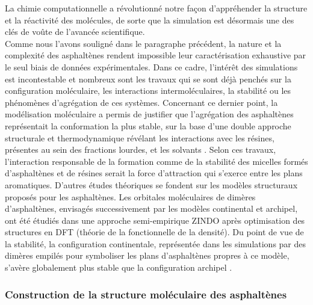\documentclass[12pt,a4paper]{book}
\begin{document}
La chimie computationnelle a révolutionné notre façon d'appréhender la structure et la réactivité des molécules, de sorte que la simulation est désormais une des clés de voûte de l'avancée scientifique. \\
Comme nous l'avons souligné dans le paragraphe précédent, la nature et la complexité des asphaltènes rendent impossible leur caractérisation exhaustive par le seul biais de données expérimentales. Dans ce cadre, l'intérêt des simulations est incontestable et nombreux sont les travaux qui se sont déjà penchés sur la configuration moléculaire, les interactions intermoléculaires, la stabilité ou les phénomènes d'agrégation de ces systèmes.  
Concernant ce dernier point, la modélisation moléculaire a permis de justifier que l'agrégation des asphaltènes représentait la conformation la plus stable, sur la base d'une double approche structurale et thermodynamique révélant les interactions avec les résines, présentes au sein des fractions lourdes, et les solvants \cite{murgich1996molecular}. Selon ces travaux, l'interaction responsable de la formation comme de la stabilité des micelles formés d'asphaltènes et de résines serait la force d'attraction qui s'exerce entre les plans aromatiques. 
D'autres études théoriques se fondent sur les modèles structuraux proposés pour les asphaltènes. Les orbitales moléculaires de dimères d'asphaltènes, envisagés successivement par les modèles continental et archipel, ont été étudiés dans une approche semi-empirique ZINDO après optimisation des structures en DFT (théorie de la fonctionnelle de la densité). Du point de vue de la stabilité, la configuration continentale, représentée dans les simulations par des dimères empilés pour symboliser les plans d'asphaltènes propres à ce modèle, s'avère globalement plus stable que la configuration archipel \cite{alvarez2013island}. 


\subsubsection{Construction de la structure moléculaire des asphaltènes}
\end{document}
